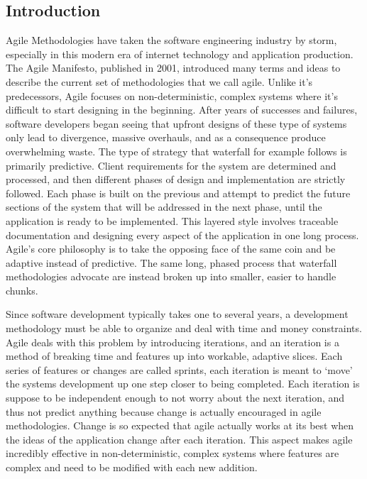\documentclass[11pt]{article}
\newcommand{\tab}{\hspace*{2em}}
\begin{document}
\begin{doublespace}

\section{Introduction}

\tab Agile Methodologies have taken the software engineering industry by storm, especially in this modern era of internet technology and application production. The Agile Manifesto, published in 2001, introduced many terms and ideas to describe the current set of methodologies that we call agile. Unlike it's predecessors, Agile focuses on non-deterministic, complex systems where it’s difficult to start designing in the beginning. After years of successes and failures, software developers began seeing that upfront designs of these type of systems only lead to divergence, massive overhauls, and as a consequence produce overwhelming waste. The type of strategy that waterfall for example follows is primarily predictive. Client requirements for the system are determined and processed, and then different phases of design and implementation are strictly followed. Each phase is built on the previous and attempt to predict the future sections of the system that will be addressed in the next phase, until the application is ready to be implemented. This layered style involves traceable documentation and designing every aspect of the application in one long process. Agile’s core philosophy is to take the opposing face of the same coin and be adaptive instead of predictive. The same long, phased process that waterfall methodologies advocate are instead broken up into smaller, easier to handle chunks. 
 
\tab Since software development typically takes one to several years, a development methodology must be able to organize and deal with time and money constraints. Agile deals with this problem by introducing iterations, and an iteration is a method of breaking time and features up into workable, adaptive slices. Each series of features or changes are called sprints, each iteration is meant to ‘move’ the systems development up one step closer to being completed. Each iteration is suppose to be independent enough to not worry about the next iteration, and thus not predict anything because change is actually encouraged in agile methodologies. Change is so expected that agile actually works at its best when the ideas of the application change after each iteration. This aspect makes agile incredibly effective in non-deterministic, complex systems where features are complex and need to be modified with each new addition.
    

\end{doublespace}
\end{document}
